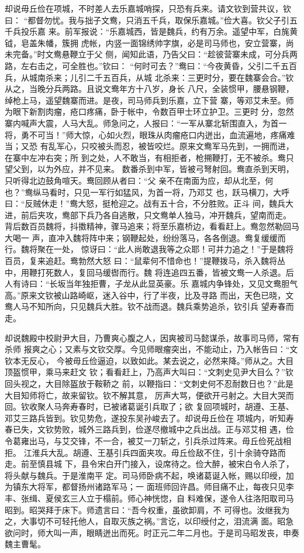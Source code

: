 却说毋丘俭在项城，不时差人去乐嘉城哨探，只恐有兵来。请文钦到营共议，钦曰：
“都督勿忧。我与拙子文鸯，只消五千兵，取保乐嘉城。”俭大喜。钦父子引五千兵投乐嘉
来。前军报说：“乐嘉城西，皆是魏兵，约有万余。遥望中军，白旄黄钺，皂盖朱幡，簇拥
虎帐，内竖一面锦绣帅字旗，必是司马师也，安立营寨，尚未完备。”时文鸯悬鞭立于父
侧，闻知此语，乃告父曰：“趁彼营寨未成，可分兵两路，左右击之，可全胜也。”钦曰：
“何时可去？”鸯曰：“今夜黄昏，父引二千五百兵，从城南杀来；儿引二千五百兵，从城
北杀来：三更时分，要在魏寨会合。”钦从之，当晚分兵两路。且说文鸯年方十八岁，身长
八尺，全装惯甲，腰悬钢鞭，绰枪上马，遥望魏寨而进。是夜，司马师兵到乐嘉，立下营
寨，等邓艾未至。师为眼下新割肉瘤，疮口疼痛，卧于帐中，令数百甲士环立护卫。三更时
分，忽然寨内喊声大震，人马大乱。师急问之，人报曰：“一军从寨北斩围直入，为首一
将，勇不可当！”师大惊，心如火烈，眼珠从肉瘤疮口内迸出，血流遍地，疼痛难当；又恐
有乱军心，只咬被头而忍，被皆咬烂。原来文鸯军马先到，一拥而进，在寨中左冲右突；所
到之处，人不敢当，有相拒者，枪搠鞭打，无不被杀。鸯只望父到，以为外应，并不见来。
数番杀到中军，皆被弓弩射回。鸯直杀到天明，只听得北边鼓角喧天。鸯回顾从者曰：“父
亲不在南面为应，却从北至，何也？”鸯纵马看时，只见一军行如猛风，为首一将，乃邓艾
也，跃马横刀，大呼曰：“反贼休走！”鸯大怒，挺枪迎之。战有五十合，不分胜败。正斗
间，魏兵大进，前后夹攻，鸯部下兵乃各自逃散，只文鸯单人独马，冲开魏兵，望南而走。
背后数百员魏将，抖擞精神，骤马追来；将至乐嘉桥边，看看赶上。鸯忽然勒回马大喝一
声，直冲入魏将阵中来；钢鞭起处，纷纷落马，各各倒退。鸯复缓缓而行。魏将聚在一处，
惊讶曰：“此人尚敢退我等之众耶！可并力追之！”于是魏将百员，复来追赶。鸯勃然大怒
曰：“鼠辈何不惜命也！”提鞭拨马，杀入魏将丛中，用鞭打死数人，复回马缓辔而行。魏
将连追四五番，皆被文鸯一人杀退。后人有诗曰：“长坂当年独拒曹，子龙从此显英豪。乐
嘉城内争锋处，又见文鸯胆气高。”原来文钦被山路崎岖，迷入谷中，行了半夜，比及寻路
而出，天色已晓，文鸯人马不知所向，只见魏兵大胜。钦不战而退。魏兵乘势追杀，钦引兵
望寿春而走。

却说魏殿中校尉尹大目，乃曹爽心腹之人，因爽被司马懿谋杀，故事司马师，常有杀师
报爽之心；又素与文钦交厚。今见师眼瘤突出，不能动止，乃入帐告曰：“文钦本无反心，
今被毋丘俭逼迫，以致如此。某去说之，必然来降。”师从之。大目顶盔惯甲，乘马来赶文
钦；看看赶上，乃高声大叫曰：“文刺史见尹大目么？”钦回头视之，大目除盔放于鞍鞒之
前，以鞭指曰：“文刺史何不忍耐数日也？”此是大目知师将亡，故来留钦。钦不解其意，
厉声大骂，便欲开弓射之。大目大哭而回。钦收聚人马奔寿春时，已被诸葛诞引兵取了；欲
复回项城时，胡遵、王基、邓艾三路兵皆到。钦见势危，遂投东吴孙峻去了。却说毋丘俭在
项城内，听知寿春已失，文钦势败，城外三路兵到，俭遂尽撤城中之兵出战。正与邓艾相
遇，俭令葛雍出马，与艾交锋，不一合，被艾一刀斩之，引兵杀过阵来。毋丘俭死战相拒。
江淮兵大乱。胡遵、王基引兵四面夹攻。毋丘俭敌不住，引十余骑夺路而走。前至慎县城
下，县令宋白开门接入，设席待之。俭大醉，被宋白令人杀了，将头献与魏兵。于是淮南平
定。司马师卧病不起，唤诸葛诞入帐，赐以印绶，加为镇东大将军，都督扬州诸路军马；一
面班师回许昌。师目痛不止，每夜只见李丰、张缉、夏侯玄三人立于榻前。师心神恍惚，自
料难保，遂令人往洛阳取司马昭到。昭哭拜于床下。师遗言曰：“吾今权重，虽欲卸肩，不
可得也。汝继我为之，大事切不可轻托他人，自取灭族之祸。”言讫，以印绶付之，泪流满
面。昭急欲问时，师大叫一声，眼睛迸出而死。时正元二年二月也。于是司马昭发丧，申奏
魏主曹髦。


